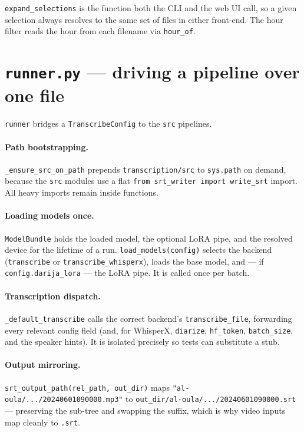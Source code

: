 \documentclass[11pt,a4paper]{report}
\newcommand{\code}[1]{\texttt{\small #1}}
\begin{document}
\code{expand\_selections} is the function both the CLI and the web UI call, so a
given selection always resolves to the same set of files in either front-end. The
hour filter reads the hour from each filename via \code{hour\_of}.

\section{\texttt{runner.py} --- driving a pipeline over one file}

\code{runner} bridges a \code{TranscribeConfig} to the \texttt{src} pipelines.

\paragraph{Path bootstrapping.} \code{\_ensure\_src\_on\_path} prepends
\code{transcription/src} to \code{sys.path} on demand, because the \texttt{src}
modules use a flat \code{from srt\_writer import write\_srt} import. All heavy
imports remain inside functions.

\paragraph{Loading models once.} \code{ModelBundle} holds the loaded model, the
optional LoRA pipe, and the resolved device for the lifetime of a run.
\code{load\_models(config)} selects the backend (\code{transcribe} or
\code{transcribe\_whisperx}), loads the base model, and --- if
\code{config.darija\_lora} --- the LoRA pipe. It is called once per batch.

\paragraph{Transcription dispatch.} \code{\_default\_transcribe} calls the correct
backend's \code{transcribe\_file}, forwarding every relevant config field (and, for
WhisperX, \code{diarize}, \code{hf\_token}, \code{batch\_size}, and the speaker
hints). It is isolated precisely so tests can substitute a stub.

\paragraph{Output mirroring.} \code{srt\_output\_path(rel\_path, out\_dir)} maps
\code{"al-oula/.../20240601090000.mp3"} to
\code{out\_dir/al-oula/.../20240601090000.srt} --- preserving the sub-tree and
swapping the suffix, which is why video inputs map cleanly to \code{.srt}.
\end{document}
